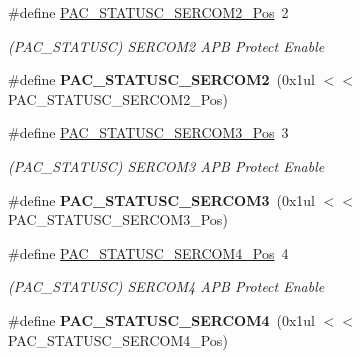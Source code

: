\begin{DoxyCompactItemize}
\item 
\hypertarget{group___s_a_m_l21___p_a_c_gaa2bc2635a68e9b6e1fc13947c217e09b}{}\#define \hyperlink{group___s_a_m_l21___p_a_c_gaa2bc2635a68e9b6e1fc13947c217e09b}{P\+A\+C\+\_\+\+S\+T\+A\+T\+U\+S\+C\+\_\+\+S\+E\+R\+C\+O\+M2\+\_\+\+Pos}~2\label{group___s_a_m_l21___p_a_c_gaa2bc2635a68e9b6e1fc13947c217e09b}

\begin{DoxyCompactList}\small\item\em (P\+A\+C\+\_\+\+S\+T\+A\+T\+U\+S\+C) S\+E\+R\+C\+O\+M2 A\+P\+B Protect Enable \end{DoxyCompactList}\item 
\hypertarget{group___s_a_m_l21___p_a_c_ga324cb29ab81c1d4626cf3f7ae0c7fb67}{}\#define {\bfseries P\+A\+C\+\_\+\+S\+T\+A\+T\+U\+S\+C\+\_\+\+S\+E\+R\+C\+O\+M2}~(0x1ul $<$$<$ P\+A\+C\+\_\+\+S\+T\+A\+T\+U\+S\+C\+\_\+\+S\+E\+R\+C\+O\+M2\+\_\+\+Pos)\label{group___s_a_m_l21___p_a_c_ga324cb29ab81c1d4626cf3f7ae0c7fb67}

\item 
\hypertarget{group___s_a_m_l21___p_a_c_ga07a68bd335ef06b3911d252db86c3049}{}\#define \hyperlink{group___s_a_m_l21___p_a_c_ga07a68bd335ef06b3911d252db86c3049}{P\+A\+C\+\_\+\+S\+T\+A\+T\+U\+S\+C\+\_\+\+S\+E\+R\+C\+O\+M3\+\_\+\+Pos}~3\label{group___s_a_m_l21___p_a_c_ga07a68bd335ef06b3911d252db86c3049}

\begin{DoxyCompactList}\small\item\em (P\+A\+C\+\_\+\+S\+T\+A\+T\+U\+S\+C) S\+E\+R\+C\+O\+M3 A\+P\+B Protect Enable \end{DoxyCompactList}\item 
\hypertarget{group___s_a_m_l21___p_a_c_gae1b94cd52113c476949c13f2d6a3470e}{}\#define {\bfseries P\+A\+C\+\_\+\+S\+T\+A\+T\+U\+S\+C\+\_\+\+S\+E\+R\+C\+O\+M3}~(0x1ul $<$$<$ P\+A\+C\+\_\+\+S\+T\+A\+T\+U\+S\+C\+\_\+\+S\+E\+R\+C\+O\+M3\+\_\+\+Pos)\label{group___s_a_m_l21___p_a_c_gae1b94cd52113c476949c13f2d6a3470e}

\item 
\hypertarget{group___s_a_m_l21___p_a_c_gaef6fe766733823029ad7446aefb1fdd9}{}\#define \hyperlink{group___s_a_m_l21___p_a_c_gaef6fe766733823029ad7446aefb1fdd9}{P\+A\+C\+\_\+\+S\+T\+A\+T\+U\+S\+C\+\_\+\+S\+E\+R\+C\+O\+M4\+\_\+\+Pos}~4\label{group___s_a_m_l21___p_a_c_gaef6fe766733823029ad7446aefb1fdd9}

\begin{DoxyCompactList}\small\item\em (P\+A\+C\+\_\+\+S\+T\+A\+T\+U\+S\+C) S\+E\+R\+C\+O\+M4 A\+P\+B Protect Enable \end{DoxyCompactList}\item 
\hypertarget{group___s_a_m_l21___p_a_c_gaa4bb9d543da63ee30f6c0413308ba4f6}{}\#define {\bfseries P\+A\+C\+\_\+\+S\+T\+A\+T\+U\+S\+C\+\_\+\+S\+E\+R\+C\+O\+M4}~(0x1ul $<$$<$ P\+A\+C\+\_\+\+S\+T\+A\+T\+U\+S\+C\+\_\+\+S\+E\+R\+C\+O\+M4\+\_\+\+Pos)\label{group___s_a_m_l21___p_a_c_gaa4bb9d543da63ee30f6c0413308ba4f6}


\end{DoxyCompactItemize}
